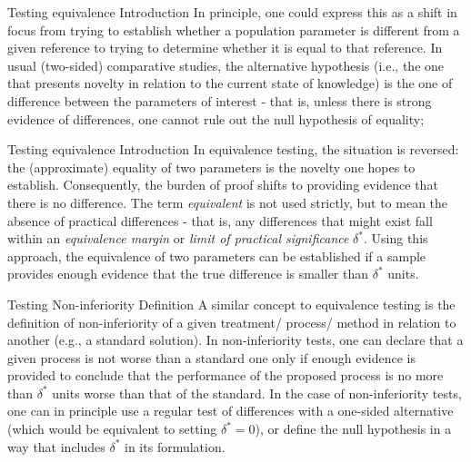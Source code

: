 \documentclass[t]{beamer}
\begin{document}

\begin{ftst}
{Testing equivalence}
{Introduction}
In principle, one could express this as a shift in focus from trying to establish whether a population parameter is different from a given reference to trying to determine whether it is equal to that reference. 
\vone
In usual (two-sided) comparative studies, the alternative hypothesis (i.e., the one that presents novelty in relation to the current state of knowledge) is the one of difference between the parameters of interest - that is, unless there is strong evidence of differences, one cannot rule out the null hypothesis of equality;
\end{ftst}


\begin{ftst}
{Testing equivalence}
{Introduction}
In equivalence testing, the situation is reversed: the (approximate) equality of two parameters is the novelty one hopes to establish. Consequently, the burden of proof shifts to providing evidence that there is no difference.
\vone
The term \textit{equivalent} is not used strictly, but to mean the absence of practical differences - that is, any differences that might exist fall within an \textit{equivalence margin} or \textit{limit of practical significance} $\delta^*$.
\vone
Using this approach, the equivalence of two parameters can be established if a sample provides enough evidence that the true difference is smaller than $\delta^*$ units.
\end{ftst}


\begin{ftst}
{Testing Non-inferiority}
{Definition}
A similar concept to equivalence testing is the definition of non-inferiority of a given treatment/ process/ method in relation to another (e.g., a standard solution).
\vone
In non-inferiority tests, one can declare that a given process is not worse than a standard one only if enough evidence is provided to conclude that the performance of the proposed process is no more than $\delta^*$ units worse than that of the standard.
\vone
In the case of non-inferiority tests, one can in principle use a regular test of differences with a one-sided alternative (which would be equivalent to setting $\delta^* = 0$), or define the null hypothesis in a way that includes $\delta^*$ in its formulation.
\end{ftst}

\end{document}
